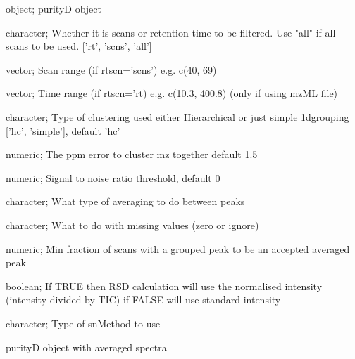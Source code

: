 \documentclass[letterpaper]{book}
\begin{document}
\begin{Arguments}
\begin{ldescription}
\item[\code{Object}] object; purityD object

\item[\code{rtscn}] character; Whether it is scans or retention time to be filtered. Use "all" if all scans to be used. ['rt', 'scns', 'all']

\item[\code{scanRange}] vector; Scan range (if rtscn='scns') e.g. c(40, 69)

\item[\code{timeRange}] vector; Time range (if rtscn='rt) e.g. c(10.3, 400.8) (only if using mzML file)

\item[\code{clustType}] character; Type of clustering used either Hierarchical or just simple 1dgrouping ['hc', 'simple'], default 'hc'

\item[\code{ppm}] numeric; The ppm error to cluster mz together default 1.5

\item[\code{snthr}] numeric; Signal to noise ratio threshold, default 0

\item[\code{av}] character; What type of averaging to do between peaks

\item[\code{missingV}] character; What to do with missing values (zero or ignore)

\item[\code{minfrac}] numeric; Min fraction of scans with a grouped peak to be an accepted averaged peak

\item[\code{normTIC}] boolean; If TRUE then RSD calculation will use the normalised intensity (intensity divided by TIC) if FALSE will use standard intensity

\item[\code{snMeth}] character; Type of snMethod to use
\end{ldescription}
\end{Arguments}
%
\begin{Value}
purityD object with averaged spectra
\end{Value}
%
\begin{SeeAlso}\relax
{}
\end{SeeAlso}
\end{document}
